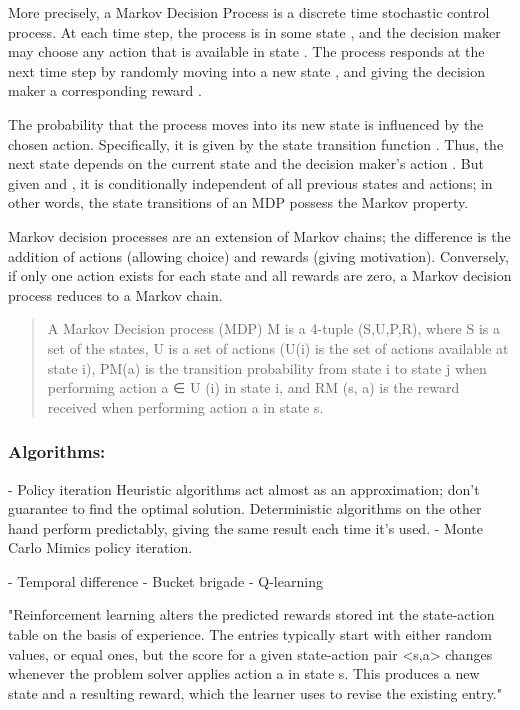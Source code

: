 \documentclass[a4paper,oneside]{report}
\begin{document}
More precisely, a Markov Decision Process is a discrete time stochastic control process. At each time step, the process is in some state , and the decision maker may choose any action  that is available in state . The process responds at the next time step by randomly moving into a new state , and giving the decision maker a corresponding reward .

The probability that the process moves into its new state  is influenced by the chosen action. Specifically, it is given by the state transition function . Thus, the next state  depends on the current state  and the decision maker's action . But given  and , it is conditionally independent of all previous states and actions; in other words, the state transitions of an MDP possess the Markov property.

Markov decision processes are an extension of Markov chains; the difference is the addition of actions (allowing choice) and rewards (giving motivation). Conversely, if only one action exists for each state and all rewards are zero, a Markov decision process reduces to a Markov chain.



\begin{quotation}A Markov Decision process (MDP) M is a 4-tuple (S,U,P,R), where S is a set of the
states, U is a set of actions (U(i) is the set of actions available at state i), PM(a) is the transition probability from state i to state j when performing action a ∈ U (i) in state i, and RM (s, a) is the reward received when performing action a in state s.\end{quotation}

\subsubsection{Algorithms:}

- Policy iteration
Heuristic algorithms act almost as an approximation; don't guarantee to find the optimal solution. Deterministic algorithms on the other hand perform predictably, giving the same result each time it's used. 
- Monte Carlo
Mimics policy iteration. 

- Temporal difference
- Bucket brigade
- Q-learning

"Reinforcement learning alters the predicted rewards stored int the state-action table on the basis of experience. The entries typically start with either random values, or equal ones, but the score for a given state-action pair <s,a> changes whenever the problem solver applies action a in state s. This produces a new state and a resulting reward, which the learner uses to revise the existing entry."
\end{document}
